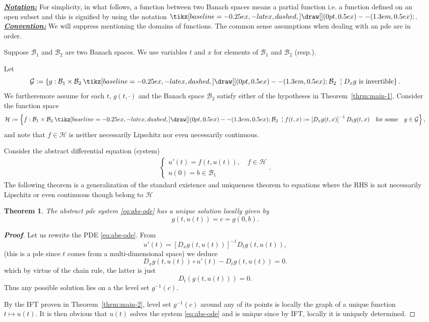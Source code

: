\documentclass[a4, 12pt,leqno]{amsart}
\theoremstyle{plain}
\newtheorem{theorem}{Theorem}
\theoremstyle{definition}
\theoremstyle{remark}
\numberwithin{equation}{section}
\newcommand{\B}{\mathcal{B}}
\newcommand*{\DashedArrow}[1][]{\mathbin{\tikz [baseline=-0.25ex,-latex, dashed,#1] \draw [#1] (0pt,0.5ex) -- (1.3em,0.5ex);}}%
\begin{document}
\noindent\underline{\small \emph{\textbf{Notation:}}} For simplicity, in what follows, a function between two Banach spaces means a partial function i.e. a function defined on an open subset and this is signified by using the notation
$\DashedArrow$.\newline
\noindent\underline{\small \emph{\textbf{Convention:}}} We will suppress mentioning the domains of functions. The common sense assumptions when dealing with an pde are in order. 

\par Suppose $\B_1$ and $\B_2$ are two Banach spaces. We use variables $t$ and $x$ for elements of $\B_1$ and $\B_2$ (resp.). 

Let
\[
\mathcal{G}:= \left\{g: \B_1 \times \B_2 \DashedArrow \B_2 \; \;\text{\textbrokenbar}\; \text{$D_xg$ is invertible} \right\}.
\]
We furtheremore assume for each $t$, $g(t,\cdot)$ and the Banach space $\B_2$ satisfy either of the hypotheses in Theorem~\ref{thrm:main-1}. Consider the function space
\[
\mathcal{H}:= \left\{f: \B_1 \times \B_2 \DashedArrow \B_2 \; \;\text{\textbrokenbar}\; f(t,x) := \left[D_xg(t,x)\right]^{-1} D_tg(t,x) \quad \text{for some} \quad g \in \mathcal{G}\right\},
\]
and note that $f\in \mathcal{H}$ is neither necessarily Lipschitz nor even necessarily continuous. 

\par Consider the abstract differential equation (system)
\begin{align}\label{eq:abs-ode}
\begin{cases} u'(t) = f(t,u(t)), \quad f \in \mathcal{H}\\
	u(0) = b\in \B_1
\end{cases}.
\end{align}
The following theorem is a generalization of the standard existence and uniqueness theorem to equations where the RHS is not necessarily Lipschitz or even continuous though belong to $\mathcal{H}$

\begin{theorem}
	The abstract pde system \eqref{eq:abs-ode} has a unique solution locally given by
	\[
	g(t,u(t)) = c = g(0,b).
	\]
\end{theorem}

\begin{proof}[\footnotesize \textbf{Proof}]
\par Let us rewrite the PDE \ref{eq:abs-ode}. From
\[
u'(t) = \left[D_xg(t,u(t))\right]^{-1} D_tg(t,u(t)),
\]
(this is a pde since $t$ comes from a multi-dimensional space)
we deduce
\[
D_xg(t,u(t))\circ u'(t) - D_tg(t,u(t)) = 0.
\]
which by virtue of the chain rule, the latter is just
\[
D_t\left( g(t,u(t))  \right) = 0.
\]
Thus any possible solution lies on a the level set $g^{-1}(c)$. 

\par By the IFT proven in Theorem~\ref{thrm:main-2}, level set $g^{-1}(c)$ around any of its points is locally the graph of a unique function $t \mapsto u(t)$. It is then obvious that $u(t)$ solves the system \eqref{eq:abs-ode} and is unique since by IFT, locally it is uniquely determined. 
\end{proof}
\end{document}
